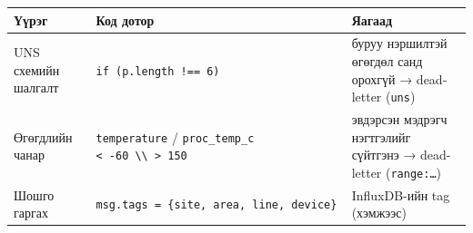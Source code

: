 \begingroup\scriptsize\begin{longtable}[]{@{}lll@{}}
\toprule
\begin{minipage}[b]{0.30\columnwidth}\raggedright
Үүрэг\strut
\end{minipage} & \begin{minipage}[b]{0.30\columnwidth}\raggedright
Код дотор\strut
\end{minipage} & \begin{minipage}[b]{0.30\columnwidth}\raggedright
Яагаад\strut
\end{minipage}\tabularnewline
\midrule
\endhead
\begin{minipage}[t]{0.30\columnwidth}\raggedright
UNS схемийн шалгалт\strut
\end{minipage} & \begin{minipage}[t]{0.30\columnwidth}\raggedright
\texttt{if\ (p.\allowbreak{}length\ !=\allowbreak{}=\allowbreak{}\ 6)}\strut
\end{minipage} & \begin{minipage}[t]{0.30\columnwidth}\raggedright
буруу нэршилтэй өгөгдөл санд орохгүй → dead-letter (\texttt{uns})\strut
\end{minipage}\tabularnewline
\begin{minipage}[t]{0.30\columnwidth}\raggedright
Өгөгдлийн чанар\strut
\end{minipage} & \begin{minipage}[t]{0.30\columnwidth}\raggedright
\texttt{temperature} / \texttt{proc\_\allowbreak{}temp\_\allowbreak{}c} \texttt{\textless{}\ -60\ \textbackslash{}\textbar{}\textbackslash{}\textbar{}\ \textgreater{}\ 150}\strut
\end{minipage} & \begin{minipage}[t]{0.30\columnwidth}\raggedright
эвдэрсэн мэдрэгч нэгтгэлийг сүйтгэнэ → dead-letter (\texttt{range:\ldots{}})\strut
\end{minipage}\tabularnewline
\begin{minipage}[t]{0.30\columnwidth}\raggedright
Шошго гаргах\strut
\end{minipage} & \begin{minipage}[t]{0.30\columnwidth}\raggedright
\texttt{msg.\allowbreak{}tags\ =\allowbreak{}\ \{site,\ area,\ line,\ device\}}\strut
\end{minipage} & \begin{minipage}[t]{0.30\columnwidth}\raggedright
InfluxDB-ийн tag (хэмжээс)\strut
\end{minipage}\tabularnewline
\bottomrule
\end{longtable}\endgroup


